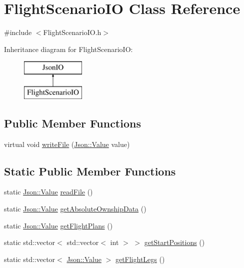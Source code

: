 \hypertarget{class_flight_scenario_i_o}{}\section{Flight\+Scenario\+IO Class Reference}
\label{class_flight_scenario_i_o}


{\ttfamily \#include $<$Flight\+Scenario\+I\+O.\+h$>$}

Inheritance diagram for Flight\+Scenario\+IO\+:\begin{figure}[H]
\begin{center}
\leavevmode
\includegraphics[height=2.000000cm]{class_flight_scenario_i_o}
\end{center}
\end{figure}
\subsection*{Public Member Functions}
\begin{DoxyCompactItemize}
\item 
virtual void \hyperlink{class_flight_scenario_i_o_a391009055a8c4973de8f61a4cef015a6}{write\+File} (\hyperlink{class_json_1_1_value}{Json\+::\+Value} value)
\end{DoxyCompactItemize}
\subsection*{Static Public Member Functions}
\begin{DoxyCompactItemize}
\item 
static \hyperlink{class_json_1_1_value}{Json\+::\+Value} \hyperlink{class_flight_scenario_i_o_ab4cd400bd08c78fd6e88d8eaa7bbe6dc}{read\+File} ()
\item 
static \hyperlink{class_json_1_1_value}{Json\+::\+Value} \hyperlink{class_flight_scenario_i_o_a98f00808674c8239c9aede07c29576b0}{get\+Absolute\+Ownship\+Data} ()
\item 
static \hyperlink{class_json_1_1_value}{Json\+::\+Value} \hyperlink{class_flight_scenario_i_o_a51ff32ca2f45f95b843fb7a9966e3734}{get\+Flight\+Plans} ()
\item 
static std\+::vector$<$ std\+::vector$<$ int $>$ $>$ \hyperlink{class_flight_scenario_i_o_a81094ac93be8c44464dff144262f9680}{get\+Start\+Positions} ()
\item 
static std\+::vector$<$ \hyperlink{class_json_1_1_value}{Json\+::\+Value} $>$ \hyperlink{class_flight_scenario_i_o_a3b65c0985f1adc92b3d5f9109c842c8d}{get\+Flight\+Legs} ()
\end{DoxyCompactItemize}


